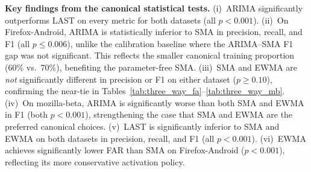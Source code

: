 \documentclass[a4paper,fleqn]{cas-sc}
\theoremstyle{plain}
\begin{document}
\begin{table}[tbp]
\centering
{}
\caption{Wilcoxon signed-rank $p$-values on the canonical
  60\%/20\%/20\% test set, mozilla-beta ($n=1{,}477$ signatures).}
\label{tab:can_wil_mb}
\end{table}

\textbf{Key findings from the canonical statistical tests.}
(i)~ARIMA significantly outperforms LAST on every metric for both datasets
(all $p < 0.001$).
(ii)~On Firefox-Android, ARIMA is statistically inferior to SMA in
precision, recall, and F1 (all $p \leq 0.006$), unlike the calibration
baseline where the ARIMA--SMA F1 gap was not significant.
This reflects the smaller canonical training proportion (60\% vs.\ 70\%),
benefiting the parameter-free SMA.
(iii)~SMA and EWMA are \emph{not} significantly different in precision
or F1 on either dataset ($p \geq 0.10$), confirming the near-tie in
Tables~\ref{tab:three_way_fa}--\ref{tab:three_way_mb}.
(iv)~On mozilla-beta, ARIMA is significantly worse than both SMA and EWMA
in F1 (both $p < 0.001$), strengthening the case that SMA and EWMA
are the preferred canonical choices.
(v)~LAST is significantly inferior to SMA and EWMA on both datasets
in precision, recall, and F1 (all $p < 0.001$).
(vi)~EWMA achieves significantly lower FAR than SMA on Firefox-Android
($p < 0.001$), reflecting its more conservative activation policy.
\end{document}
